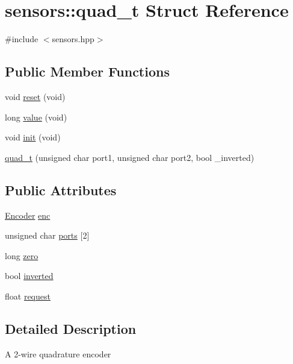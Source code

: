 \hypertarget{structsensors_1_1quad__t}{}\section{sensors\+:\+:quad\+\_\+t Struct Reference}
\label{structsensors_1_1quad__t}


{\ttfamily \#include $<$sensors.\+hpp$>$}

\subsection*{Public Member Functions}
\begin{DoxyCompactItemize}
\item 
void \hyperlink{structsensors_1_1quad__t_ab68ad73b35c435a8b3419403c0e95b74}{reset} (void)
\item 
long \hyperlink{structsensors_1_1quad__t_a5d05cb2d530870f1108c4181715f7006}{value} (void)
\item 
void \hyperlink{structsensors_1_1quad__t_a27e6a2d1744cea7570b81fb03086cfa4}{init} (void)
\item 
\hyperlink{structsensors_1_1quad__t_a5d32ea19d30a4b33e6d99f94df08b9e7}{quad\+\_\+t} (unsigned char port1, unsigned char port2, bool \+\_\+inverted)
\end{DoxyCompactItemize}
\subsection*{Public Attributes}
\begin{DoxyCompactItemize}
\item 
\hyperlink{API_8h_a8289b20280bf9db1462f60dae76d2939}{Encoder} \hyperlink{structsensors_1_1quad__t_ab6355ae9a56dea947376ccfd2b3b9da8}{enc}
\item 
unsigned char \hyperlink{structsensors_1_1quad__t_ab3ac2cbedde9a5d8cb680e8c4bcdec74}{ports} \mbox{[}2\mbox{]}
\item 
long \hyperlink{structsensors_1_1quad__t_a06d5116929f4ed2878d452c02470c644}{zero}
\item 
bool \hyperlink{structsensors_1_1quad__t_a7c95cf6e860fa651b3dc23535d5e1407}{inverted}
\item 
float \hyperlink{structsensors_1_1quad__t_ab1cf656f73ea0165459e90c035c0b03c}{request}
\end{DoxyCompactItemize}


\subsection{Detailed Description}
A 2-\/wire quadrature encoder 

